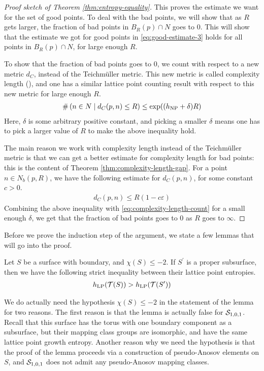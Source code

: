 \documentclass[12pt, reqno]{amsart}
\begin{document}
\begin{proof}[Proof sketch of Theorem \ref{thm:entropy-equality}]
  This proves the estimate we want for the set of good points.
  To deal with the bad points, we will show that as $R$ gets larger, the fraction of bad points in $B_R(p) \cap N$ goes to $0$.
  This will show that the estimate we got for good points in \eqref{eq:good-estimate-3} holds for all points in $B_R(p) \cap N$, for large enough $R$.

  To show that the fraction of bad points goes to $0$, we count with respect to a new metric $d_C$, instead of the Teichmüller metric.
  This new metric is called complexity length (\textcite{dowdall2023lattice}), and one has a similar lattice point counting result with respect to this new metric for large enough $R$.
  \begin{align}
    \#\left( n \in N \mid d_C(p, n) \leq R \right) \leq \exp((h_{\mathrm{NP}} + \delta) R)
    \label{eq:complexity-length-count}
  \end{align}
  Here, $\delta$ is some arbitrary positive constant, and picking a smaller $\delta$ means one has to pick a larger value of $R$ to make the above inequality hold.

  The main reason we work with complexity length instead of the Teichmüller metric is that we can get a better estimate for complexity length for bad points: this is the content of Theorem \ref{thm:complexity-length-gap}.
  For a point $n \in N_b(p, R)$, we have the following estimate for $d_C(p, n)$, for some constant $c > 0$.
  \begin{align*}
    d_C(p, n) \leq R(1 - c \varepsilon)
  \end{align*}
  Combining the above inequality with \eqref{eq:complexity-length-count} for a small enough $\delta$, we get that the fraction of bad points goes to $0$ as $R$ goes to $\infty$.
\end{proof}

Before we prove the induction step of the argument, we state a few lemmas that will go into the proof.

\begin{lemma}
  \label{lem:entropy-inequality}
  Let $S$ be a surface with boundary, and $\chi(S) \leq -2$. If $S^{\prime}$ is a proper subsurface, then we have the following strict inequality between their lattice point entropies.
  \begin{align*}
    h_{\mathrm{LP}}(\mathcal{T}(S)) > h_{\mathrm{LP}}(\mathcal{T}(S^{\prime}))
  \end{align*}
\end{lemma}

\begin{rem}
  We do actually need the hypothesis $\chi(S) \leq -2$ in the statement of the lemma for two reasons.
  The first reason is that the lemma is actually false for $\mathcal{S}_{1,0,1}$.
  Recall that this surface has the torus with one boundary component as a subsurface, but their mapping class groups are isomorphic, and have the same lattice point growth entropy.
  Another reason why we need the hypothesis is that the proof of the lemma proceeds via a construction of pseudo-Anosov elements on $S$, and $\mathcal{S}_{1,0,1}$ does not admit any pseudo-Anosov mapping classes.
\end{rem}
\end{document}
